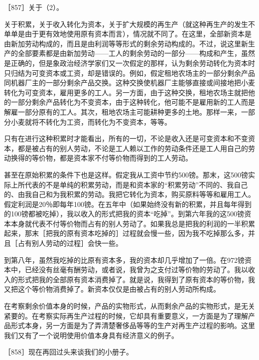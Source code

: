 ［857］关于（2）。

关于积累，关于收入转化为资本，关于扩大规模的再生产（就这种再生产的发生不单单是由于更有效地使用原有资本而言），情况就不同了。在这里，全部新资本是由新加劳动构成的，而且是由利润等等形式的剩余劳动构成的。不过，说这里新生产的全部要素都是由新加劳动——工人的剩余劳动的一部分——构成和产生，虽然是正确的，但是象政治经济学家们又一次假定的那样，认为剩余劳动转化为资本时只归结为可变资本或工资，却是错误的。例如，假定租地农场主的一部分剩余产品同机器厂主的一部分剩余产品交换。这种交换使机器厂主能够直接或间接地把小麦转化为可变资本，雇用更多的工人。另一方面，由于这种交换，租地农场主就把他的一部分剩余产品转化为不变资本，由于这种转化，他可能不是雇用新的工人而是解雇一部分原有的工人。其次，租地农场主可能耕种更多的土地。那样一来，一部分小麦就将不转化为工资，而转化为不变资本，等等。

只有在进行这种积累时才能看出，所有的一切，不论是收入还是可变资本和不变资本，都是被占有的别人劳动，不论是工人赖以工作的劳动条件还是工人用自己的劳动换得的等价物，都是资本家不付等价物而得到的工人劳动。

甚至在原始积累的条件下也是这样。假定我从工资中节约500镑。那末，这500镑实际上所代表的不是单纯的积累劳动，而是和资本家的“积累劳动”不同的、我自己的、由我自己和为我积累的劳动。我把它转化为资本，购买原料等等和雇用工人。假定利润是20％即每年100镑。在五年中（如果始终没有新的积累，并且每年得到的100镑都被吃掉），我以收入的形式把我的资本“吃掉”。到第六年我的这500镑资本本身就代表不付等价物而占有的别人劳动了。如果我总是把我的利润的一半积累起来，那末［把我的原有资本吃掉的］过程就会慢一些，因为我不吃掉那么多，并且［占有别人劳动的过程］会快一些。

\todo{}

到第八年，虽然我吃掉的比原有资本多，我的资本却几乎增加了一倍。在972镑资本中，已经没有丝毫有酬劳动，或者说，我曾为之支付过等价物的劳动了。我以收入的形式把我的全部原有资本消费掉了。就是说，我得到了原有资本的等价物，我又把这个等价物消费掉了。新资本仅仅是由被占有的别人劳动所构成。

在考察剩余价值本身的时候，产品的实物形式，从而剩余产品的实物形式，是无关紧要的。在考察实际再生产过程的时候，它却具有重要意义，一方面是为了理解产品形式本身，另一方面是为了弄清楚奢侈品等等的生产对再生产过程的影响。这里我们又有了一个说明使用价值本身具有经济意义的例子。


［858］现在再回过头来谈我们的小册子。

